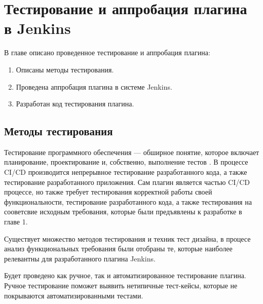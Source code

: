 \chapter{Тестирование и аппробация плагина в Jenkins} \label{ch4}


В главе описано проведенное тестирование и аппробация плагина:

\begin{enumerate}
	\item Описаны методы тестирования.
	
	\item Проведена аппробация плагина в системе Jenkins.
	
	\item Разработан код тестирования плагина.
	
	
	
\end{enumerate}

\section{Методы тестирования} \label{ch4:sec1}

Тестирование программного обеспечения — обширное понятие, которое включает планирование, проектирование и, собственно, выполнение тестов  \cite{testing}. В процессе CI/CD производится непрерывное тестирование разработанного кода, а также тестирование разработанного приложения. Сам плагин является частью CI/CD процессе, но также требует тестирования корректной работы своей функциональности, тестирование разработанного кода, а также тестирования на сооветсвие исходным требования, которые были предъявлены к разработке в главе 1.

Существует множество методов тестирования и техник тест дизайна, в процесе анализ функциональных требования были отобраны те, которые наиболее релевантны для разработанного плагина Jenkins.

Будет проведено как ручное, так и автоматизированное тестирование плагина. Ручное тестирование поможет выявить нетипичные тест-кейсы, которые не покрываются автоматизированными тестами.

